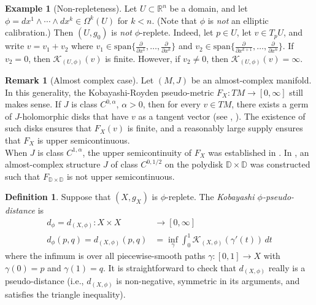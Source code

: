 \documentclass[11pt]{article}
\newcommand{\R}{\mathbb{R}}
\theoremstyle{definition}
\newtheorem{defn}[thm]{Definition}
\newtheorem{example}[thm]{Example}
\newtheorem{rmk}[thm]{Remark}
\numberwithin{equation}{section}
\begin{document}
\begin{example}[Non-repleteness] Let $U \subset \R^n$ be a domain, and let $\phi = dx^1 \wedge \cdots \wedge dx^k \in \Omega^k(U)$ for $k < n$.  (Note that $\phi$ is \emph{not} an elliptic calibration.)  Then $(U, g_0)$ is \emph{not} $\phi$-replete.  Indeed, let $p \in U$, let $v \in T_pU$, and write $v = v_1 + v_2$ where $v_1 \in \mathrm{span}\{ \frac{\partial}{\partial x^1}, \ldots, \frac{\partial}{\partial x^k}\}$ and $v_2 \in \mathrm{span}\{ \frac{\partial}{\partial x^{k+1} }, \ldots, \frac{\partial}{\partial x^n}\}$.  If $v_2 = 0$, then $\mathcal{K}_{(U,\phi)}(v)$ is finite.  However, if $v_2 \neq 0$, then $\mathcal{K}_{(U,\phi)}(v) = \infty$.
\end{example}

\begin{rmk}[Almost complex case] Let $(M, J)$ be an almost-complex manifold.  In this generality, the Kobayashi-Royden pseudo-metric $F_X \colon TM \to [0,\infty]$ still makes sense.  If $J$ is class $C^{0,\alpha}$, $\alpha > 0$, then for every $v \in TM$, there exists a germ of $J$-holomorphic disks that have $v$ as a tangent vector (see \cite[Theorem III]{nijenhuis1963some}, \cite[Appendix 1]{ivashkovich2004schwarz}).  The existence of such disks ensures that $F_X(v)$ is finite, and a reasonably large supply ensures that $F_X$ is upper semicontinuous. \\
\indent When $J$ is class $C^{1,\alpha}$, the upper semicontinuity of $F_X$ was established in \cite{ivashkovich2004schwarz}.  In \cite{ivashkovich2005upper}, an almost-complex structure $J$ of class $C^{0,1/2}$ on the polydisk $\mathbb{D} \times \mathbb{D}$ was constructed such that $F_{\mathbb{D} \times \mathbb{D}}$ is not upper semicontinuous.
\end{rmk}

\begin{defn} Suppose that $(X, g_X)$ is $\phi$-replete.  The \emph{Kobayashi $\phi$-pseudo-distance} is
\begin{align*}
d_\phi = d_{(X,\phi)} \colon X \times X & \to [0,\infty] \\
d_\phi(p,q) = d_{(X,\phi)}(p,q) & = \inf_\gamma \int_0^1 \mathcal{K}_{(X,\phi)}( \gamma'(t))\,dt
\end{align*}
where the infimum is over all piecewise-smooth paths $\gamma \colon [0,1] \to X$ with $\gamma(0) = p$ and $\gamma(1) = q$.  It is straightforward to check that $d_{(X, \phi)}$ really is a pseudo-distance (i.e., $d_{(X,\phi)}$ is non-negative, symmetric in its arguments, and satisfies the triangle inequality).
\end{defn}
\end{document}
